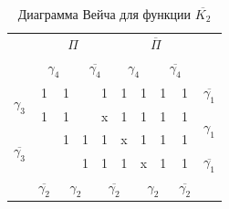 \documentclass[a4paper,14pt]{article}
\begin{document}
\begin{table}[H]
		\begin{center}
		\caption{\label{tab:dvKorrNK2} Диаграмма Вейча для функции $\overline{K_2}$}
	\begin{tabular}{cccccccccc}
		& \multicolumn{4}{c}{$\Pi$}                                                                             & \multicolumn{4}{c}{$\overline{\Pi}$}                                                                            &                     \\
		& \multicolumn{2}{c}{$\gamma_4$}                          & \multicolumn{2}{c}{$\overline{\gamma_4}$}                         & \multicolumn{2}{c}{$\gamma_4$}                          & \multicolumn{2}{c}{$\overline{\gamma_4}$}                         &                     \\ \cline{2-9}
		\multicolumn{1}{c|}{\multirow{2}{*}{$\gamma_3$}}  & \multicolumn{1}{c|}{1} & \multicolumn{1}{c|}{1} & \multicolumn{1}{c|}{}  & \multicolumn{1}{c|}{1} & \multicolumn{1}{c|}{1} & \multicolumn{1}{c|}{1} & \multicolumn{1}{c|}{1} & \multicolumn{1}{c|}{1} & $\overline{\gamma_1}$                 \\ \cline{2-9}
		\multicolumn{1}{c|}{}                     & \multicolumn{1}{c|}{1} & \multicolumn{1}{c|}{1} & \multicolumn{1}{c|}{}  & \multicolumn{1}{c|}{x} & \multicolumn{1}{c|}{1} & \multicolumn{1}{c|}{1} & \multicolumn{1}{c|}{1} & \multicolumn{1}{c|}{1} & \multirow{2}{*}{$\gamma_1$} \\ \cline{2-9}
		\multicolumn{1}{c|}{\multirow{2}{*}{$\overline{\gamma_3}$}} & \multicolumn{1}{c|}{}  & \multicolumn{1}{c|}{1} & \multicolumn{1}{c|}{1} & \multicolumn{1}{c|}{1} & \multicolumn{1}{c|}{x} & \multicolumn{1}{c|}{1} & \multicolumn{1}{c|}{1} & \multicolumn{1}{c|}{1} &                     \\ \cline{2-9}
		\multicolumn{1}{c|}{}                     & \multicolumn{1}{c|}{}  & \multicolumn{1}{c|}{}  & \multicolumn{1}{c|}{1} & \multicolumn{1}{c|}{1} & \multicolumn{1}{c|}{1} & \multicolumn{1}{c|}{x} & \multicolumn{1}{c|}{1} & \multicolumn{1}{c|}{1} & $\overline{\gamma_1}$                \\ \cline{2-9}
		&$\overline{\gamma_2}$               & \multicolumn{2}{c}{$\gamma_2$}                          & \multicolumn{2}{c}{$\overline{\gamma_2}$}                         & \multicolumn{2}{c}{$\gamma_2$}                          & $\overline{\gamma_2}$                   &                    
	\end{tabular}
\end{center}
\end{table}
\end{document}
